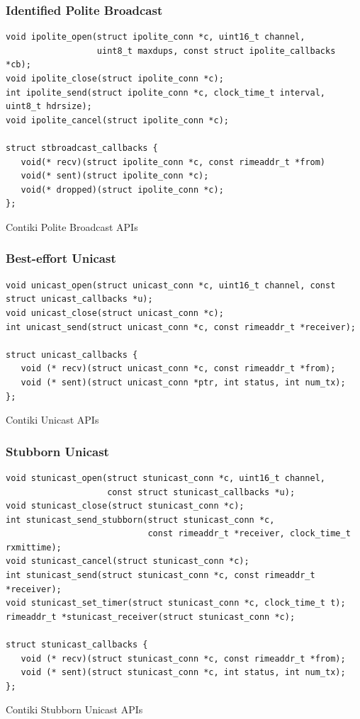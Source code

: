 \subsubsection{Identified Polite Broadcast}

\begin{listing}[H]
\begin{verbatim}
void ipolite_open(struct ipolite_conn *c, uint16_t channel,
                  uint8_t maxdups, const struct ipolite_callbacks *cb);
void ipolite_close(struct ipolite_conn *c);
int ipolite_send(struct ipolite_conn *c, clock_time_t interval, uint8_t hdrsize);
void ipolite_cancel(struct ipolite_conn *c);

struct stbroadcast_callbacks {
   void(* recv)(struct ipolite_conn *c, const rimeaddr_t *from)
   void(* sent)(struct ipolite_conn *c);
   void(* dropped)(struct ipolite_conn *c);
};
\end{verbatim}
\caption{Contiki Polite Broadcast APIs}
\end{listing}

\subsubsection{Best-effort Unicast}

\begin{listing}[H]
\begin{verbatim}
void unicast_open(struct unicast_conn *c, uint16_t channel, const struct unicast_callbacks *u);
void unicast_close(struct unicast_conn *c);
int unicast_send(struct unicast_conn *c, const rimeaddr_t *receiver);

struct unicast_callbacks {
   void (* recv)(struct unicast_conn *c, const rimeaddr_t *from);
   void (* sent)(struct unicast_conn *ptr, int status, int num_tx);
};
\end{verbatim}
\caption{Contiki Unicast APIs}
\end{listing}

\subsubsection{Stubborn Unicast}

\begin{listing}[H]
\begin{verbatim}
void stunicast_open(struct stunicast_conn *c, uint16_t channel,
                    const struct stunicast_callbacks *u);
void stunicast_close(struct stunicast_conn *c);
int stunicast_send_stubborn(struct stunicast_conn *c,
                            const rimeaddr_t *receiver, clock_time_t rxmittime);
void stunicast_cancel(struct stunicast_conn *c);
int stunicast_send(struct stunicast_conn *c, const rimeaddr_t *receiver);
void stunicast_set_timer(struct stunicast_conn *c, clock_time_t t);
rimeaddr_t *stunicast_receiver(struct stunicast_conn *c);

struct stunicast_callbacks {
   void (* recv)(struct stunicast_conn *c, const rimeaddr_t *from);
   void (* sent)(struct stunicast_conn *c, int status, int num_tx);
};
\end{verbatim}
\caption{Contiki Stubborn Unicast APIs}
\end{listing}

